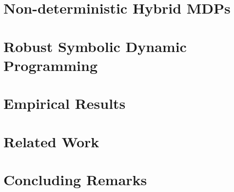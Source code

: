 \documentclass{article}
\begin{document}


\section{Non-deterministic Hybrid MDPs} 



\section{Robust Symbolic Dynamic Programming} 



\section{Empirical Results}



\section{Related Work}



\section{Concluding Remarks}







\end{document}
